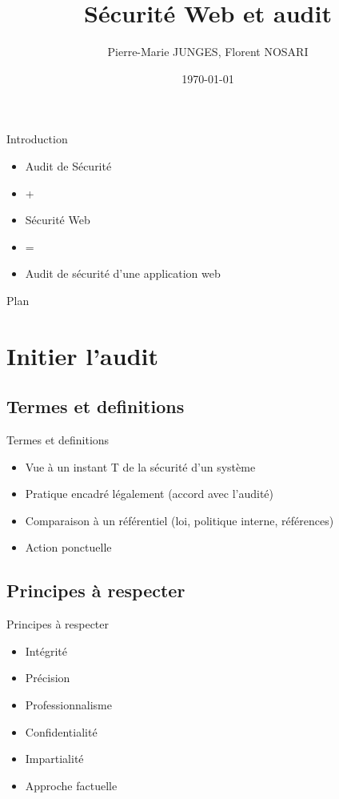 \documentclass{beamer}
\title{Sécurité Web et audit}
\author{Pierre-Marie JUNGES, Florent NOSARI}
\institute[UL] {
	Université de Lorraine \\
}
\date{\today}
\begin{document}
  \begin{frame}
  	\titlepage 
  \end{frame}

\begin{frame}{Introduction}
	\begin{itemize}
		\item Audit de Sécurité
		\item +
		\item Sécurité Web
		\item = 
		\item Audit de sécurité d'une application web
	\end{itemize}
\end{frame}

\begin{frame}{Plan}
	\tableofcontents
\end{frame}


\section{Initier l'audit}

	\subsection{Termes et definitions}
	\begin{frame}{Termes et definitions}
		\begin{itemize}
			\item Vue à un instant T de la sécurité d'un système
			\item Pratique encadré légalement (accord avec l'audité)
			\item Comparaison à un référentiel (loi, politique interne, références)
			\item Action ponctuelle
		\end{itemize}
	\end{frame}


	\subsection{Principes à respecter}
	\begin{frame}{Principes à respecter}
		\begin{itemize}
			\item Intégrité
			\item Précision
			\item Professionnalisme
			\item Confidentialité
			\item Impartialité
			\item Approche factuelle
		\end{itemize}
	
	\end{frame}
\end{document}
